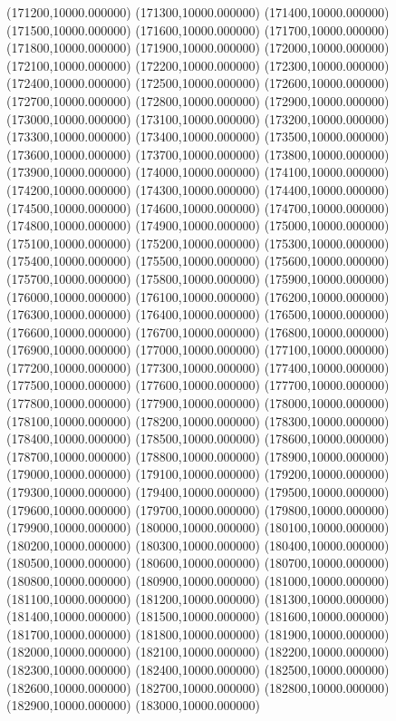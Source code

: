 (171200,10000.000000)
(171300,10000.000000)
(171400,10000.000000)
(171500,10000.000000)
(171600,10000.000000)
(171700,10000.000000)
(171800,10000.000000)
(171900,10000.000000)
(172000,10000.000000)
(172100,10000.000000)
(172200,10000.000000)
(172300,10000.000000)
(172400,10000.000000)
(172500,10000.000000)
(172600,10000.000000)
(172700,10000.000000)
(172800,10000.000000)
(172900,10000.000000)
(173000,10000.000000)
(173100,10000.000000)
(173200,10000.000000)
(173300,10000.000000)
(173400,10000.000000)
(173500,10000.000000)
(173600,10000.000000)
(173700,10000.000000)
(173800,10000.000000)
(173900,10000.000000)
(174000,10000.000000)
(174100,10000.000000)
(174200,10000.000000)
(174300,10000.000000)
(174400,10000.000000)
(174500,10000.000000)
(174600,10000.000000)
(174700,10000.000000)
(174800,10000.000000)
(174900,10000.000000)
(175000,10000.000000)
(175100,10000.000000)
(175200,10000.000000)
(175300,10000.000000)
(175400,10000.000000)
(175500,10000.000000)
(175600,10000.000000)
(175700,10000.000000)
(175800,10000.000000)
(175900,10000.000000)
(176000,10000.000000)
(176100,10000.000000)
(176200,10000.000000)
(176300,10000.000000)
(176400,10000.000000)
(176500,10000.000000)
(176600,10000.000000)
(176700,10000.000000)
(176800,10000.000000)
(176900,10000.000000)
(177000,10000.000000)
(177100,10000.000000)
(177200,10000.000000)
(177300,10000.000000)
(177400,10000.000000)
(177500,10000.000000)
(177600,10000.000000)
(177700,10000.000000)
(177800,10000.000000)
(177900,10000.000000)
(178000,10000.000000)
(178100,10000.000000)
(178200,10000.000000)
(178300,10000.000000)
(178400,10000.000000)
(178500,10000.000000)
(178600,10000.000000)
(178700,10000.000000)
(178800,10000.000000)
(178900,10000.000000)
(179000,10000.000000)
(179100,10000.000000)
(179200,10000.000000)
(179300,10000.000000)
(179400,10000.000000)
(179500,10000.000000)
(179600,10000.000000)
(179700,10000.000000)
(179800,10000.000000)
(179900,10000.000000)
(180000,10000.000000)
(180100,10000.000000)
(180200,10000.000000)
(180300,10000.000000)
(180400,10000.000000)
(180500,10000.000000)
(180600,10000.000000)
(180700,10000.000000)
(180800,10000.000000)
(180900,10000.000000)
(181000,10000.000000)
(181100,10000.000000)
(181200,10000.000000)
(181300,10000.000000)
(181400,10000.000000)
(181500,10000.000000)
(181600,10000.000000)
(181700,10000.000000)
(181800,10000.000000)
(181900,10000.000000)
(182000,10000.000000)
(182100,10000.000000)
(182200,10000.000000)
(182300,10000.000000)
(182400,10000.000000)
(182500,10000.000000)
(182600,10000.000000)
(182700,10000.000000)
(182800,10000.000000)
(182900,10000.000000)
(183000,10000.000000)
